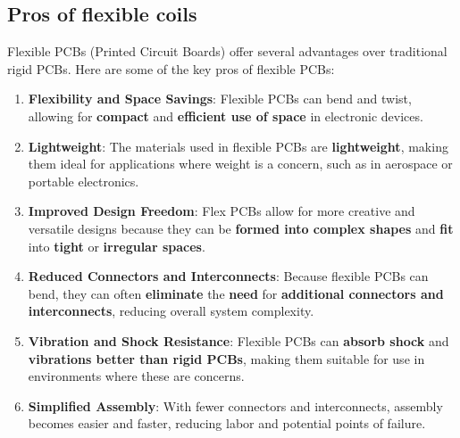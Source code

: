 \subsection{Pros of flexible coils}
Flexible PCBs (Printed Circuit Boards) offer several advantages over traditional rigid PCBs. Here are some of the key pros of flexible PCBs:

\begin{enumerate}
    \item \textbf{Flexibility and Space Savings}: Flexible PCBs can bend and twist, allowing for \textbf{compact} and \textbf{efficient use of space} in electronic devices.
    
    \item \textbf{Lightweight}: The materials used in flexible PCBs are \textbf{lightweight}, making them ideal for applications where weight is a concern, such as in aerospace or portable electronics.
    
    \item \textbf{Improved Design Freedom}: Flex PCBs allow for more creative and versatile designs because they can be \textbf{formed into complex shapes} and \textbf{fit} into \textbf{tight} or \textbf{irregular spaces}.
    
    \item \textbf{Reduced Connectors and Interconnects}: Because flexible PCBs can bend, they can often \textbf{eliminate} the \textbf{need} for \textbf{additional connectors and interconnects}, reducing overall system complexity.
    
    \item \textbf{Vibration and Shock Resistance}: Flexible PCBs can \textbf{absorb shock} and \textbf{vibrations better than rigid PCBs}, making them suitable for use in environments where these are concerns.

    \item \textbf{Simplified Assembly}: With fewer connectors and interconnects, assembly becomes easier and faster, reducing labor and potential points of failure.
\end{enumerate}